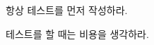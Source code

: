 
\begin{DoxyRefList}
\item[\label{todo__todo000001}%
\hypertarget{todo__todo000001}{}%
File \hyperlink{hw02_8c}{hw02.c} ]
\begin{DoxyItemize}
\item 항상 테스트를 먼저 작성하라.
\item 테스트를 할 때는 비용을 생각하라. 
\end{DoxyItemize}
\end{DoxyRefList}